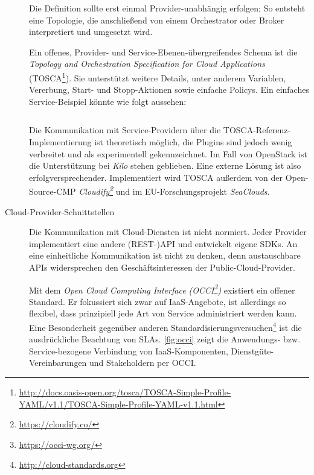 \begin{description}
		Die Definition sollte erst einmal Provider-unabhängig erfolgen; So entsteht eine Topologie, die anschließend von einem Orchestrator oder Broker interpretiert und umgesetzt wird.
		
		Ein offenes, Provider- und Service-Ebenen-übergreifendes Schema ist die \emph{Topology and Orchestration Specification for Cloud Applications} (TOSCA\footnote{\url{http://docs.oasis-open.org/tosca/TOSCA-Simple-Profile-YAML/v1.1/TOSCA-Simple-Profile-YAML-v1.1.html}}). Sie unterstützt	weitere Details, unter anderem Variablen, Vererbung, Start- und Stopp-Aktionen sowie einfache Policys. Ein einfaches Service-Beispiel könnte wie folgt aussehen:
			
		
		\inputminted[]{yaml}{./src/TOSCA.sample.yml}
		
		Die Kommunikation mit Service-Providern über die TOSCA-Referenz-Implementierung ist theoretisch möglich, die Plugins sind jedoch wenig verbreitet und als experimentell gekennzeichnet. Im Fall von OpenStack ist die Unterstützung bei \emph{Kilo} stehen geblieben. Eine externe Lösung ist also erfolgversprechender. Implementiert wird TOSCA außerdem von der Open-Source-CMP \emph{Cloudify\footnote{\url{https://cloudify.co/}}} und im EU-Forschungsprojekt \emph{SeaClouds}.
		
	
	\item[Cloud-Provider-Schnittstellen] Die Kommunikation mit Cloud-Diensten ist nicht normiert. Jeder Provider implementiert eine andere (REST-)API und entwickelt eigene SDKs. An eine einheitliche Kommunikation ist nicht zu denken, denn austauschbare APIs widersprechen den Geschäftsinteressen der Public-Cloud-Provider.
	
	Mit dem \emph{Open Cloud Computing Interface (OCCI\footnote{\url{https://occi-wg.org/}})} existiert ein offener Standard. Er fokussiert sich zwar auf IaaS-Angebote, ist allerdings so flexibel, dass prinzipiell jede Art von Service administriert werden kann. Eine Besonderheit gegenüber anderen Standardisierungsversuchen\footnote{\url{http://cloud-standards.org}} ist die ausdrückliche Beachtung von SLAs. \autoref{fig:occi} zeigt die Anwendungs- bzw. Service-bezogene Verbindung von IaaS-Komponenten, Dienstgüte-Vereinbarungen und Stakeholdern per OCCI.
	

\end{description}
